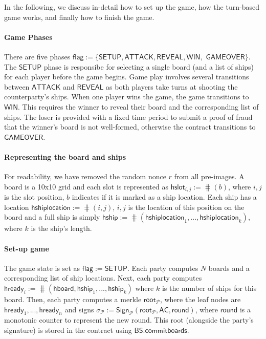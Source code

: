 \documentclass{llncs}
\newcommand{\gamestatus}{\mathsf{flag}}
\newcommand{\gamesetup}{\mathsf{SETUP}}
\newcommand{\gameattack}{\mathsf{ATTACK}}
\newcommand{\gamereveal}{\mathsf{REVEAL}}
\newcommand{\gamewinner}{\mathsf{WIN}}
\newcommand{\gamefinished}{\mathsf{GAMEOVER}}
\newcommand{\hready}{\mathsf{hready}}
\newcommand{\hboard}{\mathsf{hboard}}
\newcommand{\hslot}{\mathsf{hslot}}
\newcommand{\hship}{\mathsf{hship}}
\newcommand{\hshiplocation}{\mathsf{hshiplocation}}
\newcommand{\participant}{\mathcal{P}}
\newcommand{\sign}{\mathsf{Sign}}
\newcommand{\battleshipcommit}{\mathsf{BS.commitboards}}
\newcommand{\appcontract}{\mathsf{AC}}
\begin{document}
In the following, we discuss in-detail how to set up the game, how the turn-based game works, and finally how to finish the game. 

\paragraph{Game Phases} There are five phases $\gamestatus := \{\gamesetup, \gameattack, \gamereveal, \gamewinner,$ $ \gamefinished\}$. 
The $\gamesetup$ phase is responsibe for selecting a single board (and a list of ships) for each player before the game begins.
Game play involves several transitions between $\gameattack$ and $\gamereveal$ as both players take turns at shooting the counterparty's ships. 
When one player wins the game, the game transitions to $\gamewinner$.
This requires the winner to reveal their board and the corresponding list of ships. 
The loser is provided with a fixed time period to submit a proof of fraud that the winner's board is not well-formed, otherwise the contract transitions to $\gamefinished$. 

\paragraph{Representing the board and ships} 
For readability, we have removed the random nonce $r$ from all pre-images. 
A board is a 10x10 grid and each slot is represented as $\hslot_{i,j} := \hash(b)$, where $i,j$ is the slot position, $b$ indicates if it is marked as a ship location.
Each ship has a location $\hshiplocation := \hash(i,j)$, $i,j$ is the location of this position on the board and a full ship is simply $\hship := \hash(\hshiplocation_{1},...,\hshiplocation_{k})$, where $k$ is the ship's length.

\paragraph{Set-up game} The game state is set as $\gamestatus := \gamesetup$.
Each party computes $N$ boards and a corresponding list of ship locations. 
Next, each party computes $\hready_{i} := \hash(\hboard, \hship_{1},...,\hship_{k})$ where $k$ is the number of ships for this board. 
Then, each party computes a merkle $\mathsf{root}_{\participant}$, where the leaf nodes are $\hready_{1},...,\hready_{n}$ and signs $\sigma_{\participant} := \sign_{\participant}(\mathsf{root}_{\participant}, \appcontract, \mathsf{round})$, where $\mathsf{round}$ is a monotonic counter to represent the new round. 
This root (alongside the party's signature) is stored in the contract using $\battleshipcommit$. 
\end{document}
